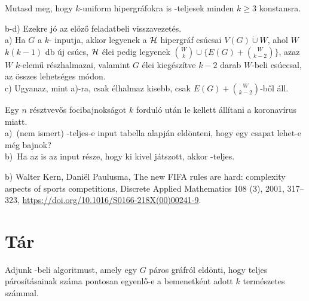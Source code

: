 \begin{Exercise}[counter={sorszam}, difficulty=0]
	Mutasd meg, hogy $k$-uniform hipergr\'afokra is \NP-teljesek minden $k\ge 3$ konstansra.
\end{Exercise}	
\begin{Answer}
	b-d) Ezekre j\'o az el\H oz\H o feladatbeli visszavezet\'es.\\
	a) Ha $G$ a $k$- inputja, akkor legyenek a $\mathcal{H}$ hipergr\'af cs\'ucsai $V(G)\dot\cup W$, ahol $W$ $k(k-1)$ db \'uj cs\'ucs, $\mathcal{H}$ \'elei pedig legyenek $\binom Wk\cup \{E(G)+\binom W{k-2}\}$, azaz $W$ $k$-elem\H u r\'eszhalmazai, valamint $G$ \'elei kieg\'esz\'itve $k-2$ darab $W$-beli cs\'uccsal, az \"osszes lehets\'eges m\'odon.\\
	c) Ugyanaz, mint a)-ra, csak \'elhalmaz kisebb, csak $E(G)+\binom W{k-2}$-b\H ol \'all.
\end{Answer}

\begin{Exercise}[counter={sorszam}, difficulty=1]
	Egy $n$ r\'esztvev\H os focibajnoks\'agot $k$ fordul\'o ut\'an le kellett \'all\'itani a koronav\'irus miatt.\\
	a)~\veryhard (nem ismert) \NP-teljes-e input tabella alapj\'an eld\"onteni, hogy egy csapat lehet-e m\'eg bajnok?\\
	b)~\hard Ha az is az input r\'esze, hogy ki kivel j\'atszott, akkor \NP-teljes.
\end{Exercise}	
\begin{Answer}
	b) Walter Kern, Dani\"el Paulusma,
	The new FIFA rules are hard: complexity aspects of sports competitions,
	Discrete Applied Mathematics 108 (3),
	2001, 317--323, \url{https://doi.org/10.1016/S0166-218X(00)00241-9}.
\end{Answer}













\chapter{T\'ar}

\begin{Exercise}[counter={sorszam}, difficulty=0]
	 Adjunk \PSPACE-beli algoritmust, amely egy $G$ páros gráfról eldönti, hogy teljes párosításainak száma pontosan egyenlő-e a bemenetként adott $k$ természetes számmal.
\end{Exercise}


